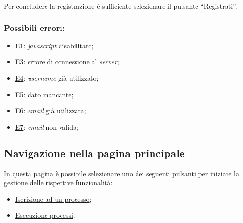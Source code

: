 Per concludere la registrazione è sufficiente selezionare il pulsante ``Registrati''.

\subsubsection*{Possibili errori:}
\begin{itemize}
\item \hyperref[e1]{E1}: \textit{javascript} disabilitato;
\item \hyperref[e3]{E3}: errore di connessione al \textit{server};
\item \hyperref[e4]{E4}: \textit{username} già utilizzato;
\item \hyperref[e5]{E5}: dato mancante;
\item \hyperref[e6]{E6}: \textit{email} già utilizzata;
\item \hyperref[e7]{E7}: \textit{email} non valida;
\end{itemize}

\subsection{Navigazione nella pagina principale}
\label{home}

In questa pagina è possibile selezionare uno dei seguenti pulsanti per iniziare la gestione delle rispettive funzionalità:
\begin{itemize}
\item  \hyperref[iscrizione]{Iscrizione ad un processo};
\item  \hyperref[gestione]{Esecuzione processi}.
\end{itemize}

